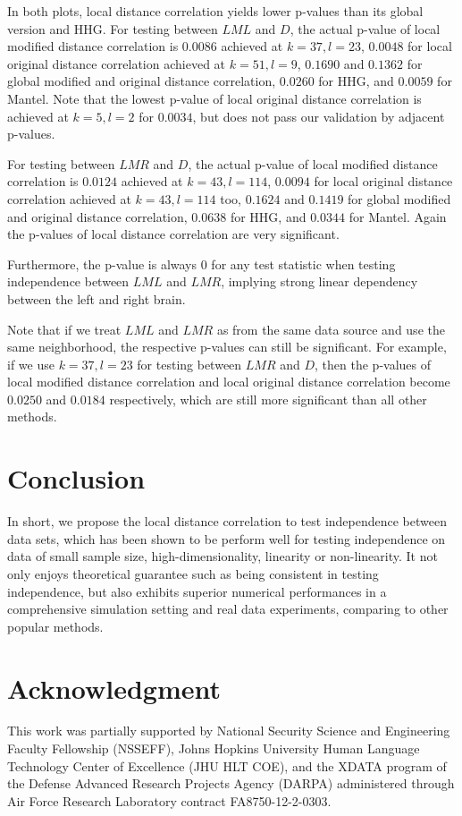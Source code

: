 \documentclass[12pt]{article}
\begin{document}
In both plots, local distance correlation yields lower p-values than its global version and HHG. For testing between $LML$ and $D$, the actual p-value of local modified distance correlation is $0.0086$ achieved at $k=37,l=23$, $0.0048$ for local original distance correlation achieved at $k=51,l=9$, $0.1690$ and $0.1362$ for global modified and original distance correlation, $0.0260$ for HHG, and $0.0059$ for Mantel. Note that the lowest p-value of local original distance correlation is achieved at $k=5,l=2$ for $0.0034$, but does not pass our validation by adjacent p-values.

For testing between $LMR$ and $D$, the actual p-value of local modified distance correlation is $0.0124$ achieved at $k=43,l=114$, $0.0094$ for local original distance correlation achieved at $k=43,l=114$ too, $0.1624$ and $0.1419$ for global modified and original distance correlation, $0.0638$ for HHG, and $0.0344$ for Mantel. Again the p-values of local distance correlation are very significant.

Furthermore, the p-value is always $0$ for any test statistic when testing independence between $LML$ and $LMR$, implying strong linear dependency between the left and right brain.

Note that if we treat $LML$ and $LMR$ as from the same data source and use the same neighborhood, the respective p-values can still be significant. For example, if we use $k=37,l=23$ for testing between $LMR$ and $D$, then the p-values of local modified distance correlation and local original distance correlation become $0.0250$ and $0.0184$ respectively, which are still more significant than all other methods. 

\section{Conclusion}
\label{conclu}
In short, we propose the local distance correlation to test independence between data sets, which has been shown to be perform well for testing independence on data of small sample size, high-dimensionality, linearity or non-linearity. It not only enjoys theoretical guarantee such as being consistent in testing independence, but also exhibits superior numerical performances in a comprehensive simulation setting and real data experiments, comparing to other popular methods.

\section*{Acknowledgment}
This work was partially supported by National Security Science and Engineering Faculty Fellowship (NSSEFF),
 Johns Hopkins University Human Language Technology Center of Excellence (JHU HLT COE), and the
 XDATA program of the Defense Advanced Research Projects Agency (DARPA) administered through Air Force Research Laboratory contract FA8750-12-2-0303.




\end{document}

